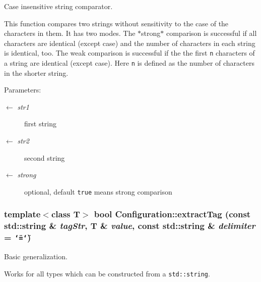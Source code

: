 Case insensitive string comparator. 

This function compares two strings without sensitivity to the case of the characters in them. It has two modes. The $\ast$strong$\ast$ comparison is successful if all characters are identical (except case) and the number of characters in each string is identical, too. The weak comparison is successful if the the first {\tt n} characters of a string are identical (except case). Here {\tt n} is defined as the number of characters in the shorter string.

\begin{Desc}
\item[Parameters:]
\begin{description}
\item[\mbox{$\leftarrow$} {\em str1}]first string \item[\mbox{$\leftarrow$} {\em str2}]second string \item[\mbox{$\leftarrow$} {\em strong}]optional, default {\tt true} means strong comparison \end{description}
\end{Desc}
\hypertarget{namespaceConfiguration_1d121b798bbbd17f070deb2cbe29076f}{
\subsubsection[extractTag]{\setlength{\rightskip}{0pt plus 5cm}template$<$class T$>$ bool Configuration::extract\-Tag (const std::string \& {\em tag\-Str}, T \& {\em value}, const std::string \& {\em delimiter} = {\tt \char`\"{}=\char`\"{}})}}
\label{namespaceConfiguration_1d121b798bbbd17f070deb2cbe29076f}


Basic generalization. 

Works for all types which can be constructed from a {\tt std::string}.

